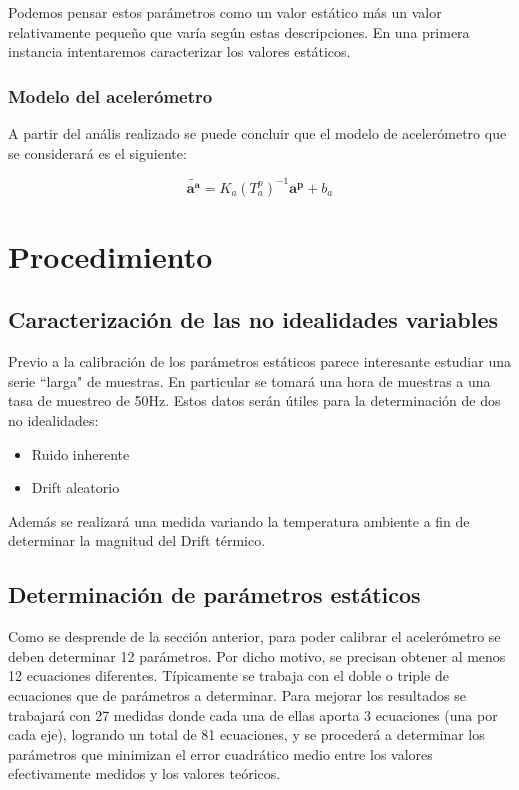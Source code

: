 \documentclass[spanish,12pt,a4paper,titlepage]{report}
\begin{document}
Podemos pensar estos parámetros como un valor estático más un valor relativamente pequeño que varía según estas descripciones. 
En una primera instancia intentaremos caracterizar los valores estáticos.   

\subsubsection{Modelo del acelerómetro}

A partir del anális realizado se puede concluir que el modelo de acelerómetro que se considerará es el siguiente:

$$\tilde{\mathbf{a^a}}=K_a(T_a^p)^{-1}\mathbf{a^p}+b_a$$

\section{Procedimiento}
\subsection{Caracterización de las no idealidades variables}

Previo a la calibración de los parámetros estáticos parece interesante estudiar una serie ``larga" de muestras. En particular se tomará una hora de muestras a una tasa de muestreo de 50Hz. Estos datos serán útiles para la determinación de dos no idealidades:  
\begin{itemize}
\item Ruido inherente
\item Drift aleatorio
\end{itemize}

Además se realizará una medida variando la temperatura ambiente a fin de determinar la magnitud del Drift térmico.

\subsection{Determinación de parámetros estáticos}

Como se desprende de la sección anterior, para poder calibrar el acelerómetro se deben determinar 12 parámetros. Por dicho motivo, se precisan obtener al menos 12 ecuaciones diferentes. Típicamente se trabaja con el doble o triple de ecuaciones que de parámetros a determinar. Para mejorar los resultados se trabajará con 27 medidas donde cada una de ellas aporta 3 ecuaciones (una por cada eje), logrando un total de 81 ecuaciones, y se procederá a determinar los parámetros que minimizan el error cuadrático medio entre los valores efectivamente medidos y los valores teóricos. 
\end{document}

